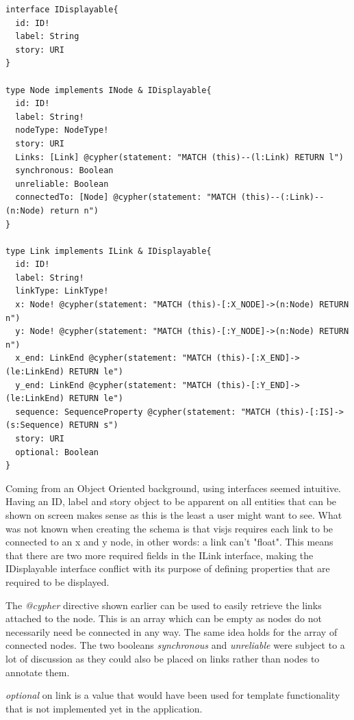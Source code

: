 \begin{lstlisting}[caption={Usage of Interfaces in GraphQL}]
interface IDisplayable{
  id: ID!
  label: String
  story: URI
}

type Node implements INode & IDisplayable{
  id: ID!
  label: String!
  nodeType: NodeType!
  story: URI
  Links: [Link] @cypher(statement: "MATCH (this)--(l:Link) RETURN l")
  synchronous: Boolean
  unreliable: Boolean
  connectedTo: [Node] @cypher(statement: "MATCH (this)--(:Link)--(n:Node) return n")
}
  
type Link implements ILink & IDisplayable{
  id: ID!
  label: String!
  linkType: LinkType!
  x: Node! @cypher(statement: "MATCH (this)-[:X_NODE]->(n:Node) RETURN n")
  y: Node! @cypher(statement: "MATCH (this)-[:Y_NODE]->(n:Node) RETURN n")
  x_end: LinkEnd @cypher(statement: "MATCH (this)-[:X_END]->(le:LinkEnd) RETURN le")
  y_end: LinkEnd @cypher(statement: "MATCH (this)-[:Y_END]->(le:LinkEnd) RETURN le")
  sequence: SequenceProperty @cypher(statement: "MATCH (this)-[:IS]->(s:Sequence) RETURN s")
  story: URI
  optional: Boolean
}

\end{lstlisting}
Coming from an Object Oriented background, using interfaces seemed intuitive. Having an ID, label and story object to be apparent on all entities that can be shown on screen makes sense as this is the least a user might want to see. What was not known when creating the schema is that visjs requires each link to be connected to an x and y node, in other words: a link can't "float". This means that there are two more required fields in the ILink interface, making the IDisplayable interface conflict with its purpose of defining properties that are required to be displayed.

\newpage
The \emph{@cypher} directive shown earlier can be used to easily retrieve the links attached to the node. This is an array which can be empty as nodes do not necessarily need be connected in any way. The same idea holds for the array of connected nodes. The two booleans \emph{synchronous} and \emph{unreliable} were subject to a lot of discussion as they could also be placed on links rather than nodes to annotate them.

\emph{optional} on link is a value that would have been used for template functionality that is not implemented yet in the application.


